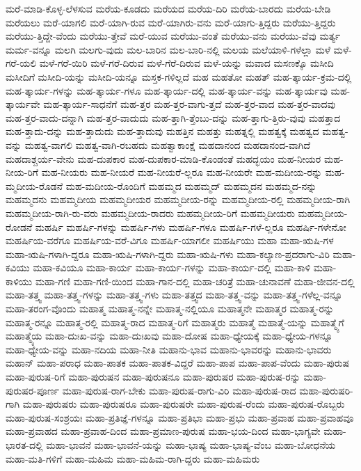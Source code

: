 {ಮರೆ-ಮಾಡಿ-ಕೊಳ್ಳ-ಲೆಳಸುವ
ಮರೆಯ-ಕೂಡದು
ಮರೆಯದ
ಮರೆಯ-ದಿರಿ
ಮರೆಯ-ಬಾರದು
ಮರೆಯ-ಬೇಡಿ
ಮರೆಯಲು
ಮರೆ-ಯಾಗಲಿ
ಮರೆ-ಯಾಗಿ-ರುವ
ಮರೆ-ಯಾಗಿರು-ವನು
ಮರೆ-ಯಾಗು-ತ್ತಿದ್ದರು
ಮರೆಯು-ತ್ತಿದ್ದರು
ಮರೆಯು-ತ್ತಿದ್ದೇ-ವೆಂದು
ಮರೆಯು-ತ್ತೇವೆ
ಮರೆ-ಯುವ
ಮರೆಯು-ವಂತೆ
ಮರೆಯು-ವನು
ಮರೆಯು-ವೆವು
ಮರ್ತ್ಯ
ಮರ್ಮ-ವನ್ನೂ
ಮಲಗಿ
ಮಲಗು-ವುದು
ಮಲ-ಬಾರಿನ
ಮಲ-ಬಾರಿ-ನಲ್ಲಿ
ಮಲಯ
ಮಲೆಯಾಳಿ-ಗಳೆಲ್ಲಾ
ಮಳೆ
ಮಳೆ-ಗರೆ-ಯಲಿ
ಮಳೆ-ಗರೆ-ಯಿರಿ
ಮಳೆ-ಗರೆ-ದಿರುವ
ಮಳೆ-ಗೆರೆ-ದಿರುವ
ಮಳೆ-ಯನ್ನು
ಮವಾದ
ಮಸಣಕ್ಕೊ
ಮಸೀದಿ
ಮಸೀದಿಗೆ
ಮಸೀದಿ-ಯನ್ನು
ಮಸೀದಿ-ಯನ್ನೂ
ಮಸ್ತಕ-ಗಳಿಲ್ಲದೆ
ಮಹ
ಮಹತೋ
ಮಹತ್
ಮಹ-ತ್ಕಾರ್ಯ-ಕ್ರಮ-ದಲ್ಲಿ
ಮಹ-ತ್ಕಾರ್ಯ-ಗಳನ್ನು
ಮಹ-ತ್ಕಾರ್ಯ-ಗಳೂ
ಮಹ-ತ್ಕಾರ್ಯ-ದಲ್ಲಿ
ಮಹ-ತ್ಕಾರ್ಯ-ವನ್ನು
ಮಹ-ತ್ಕಾರ್ಯವು
ಮಹ-ತ್ಕಾರ್ಯವೇ
ಮಹ-ತ್ಕಾರ್ಯ-ಸಾಧನೆಗೆ
ಮಹ-ತ್ತರ
ಮಹ-ತ್ತರ-ವಾಗು-ತ್ತದೆ
ಮಹ-ತ್ತರ-ವಾದ
ಮಹ-ತ್ತರ-ವಾದವು
ಮಹ-ತ್ತರ-ವಾದು-ದನ್ನಾಗಿ
ಮಹ-ತ್ತರ-ವಾದುದು
ಮಹ-ತ್ತಾಗಿ-ತ್ತೆಂಬು-ದನ್ನು
ಮಹ-ತ್ತಾಗು-ತ್ತಿರು-ವುವು
ಮಹತ್ತಾದ
ಮಹ-ತ್ತಾದು-ದನ್ನು
ಮಹ-ತ್ತಾದುದು
ಮಹ-ತ್ತಾದುವು
ಮಹತ್ತಿನ
ಮಹತ್ತು
ಮಹತ್ನಲ್ಲಿ
ಮಹತ್ವಕ್ಕೆ
ಮಹತ್ವದ
ಮಹತ್ವ-ವನ್ನು
ಮಹತ್ವ-ವಾಗಲಿ
ಮಹತ್ವ-ವಾಗಿ-ರಬಹದು
ಮಹತ್ವಾಕಾಂಕ್ಷೆ
ಮಹದಾನಂದ
ಮಹದಾನಂದ-ವಾಗಿದೆ
ಮಹದಾಶ್ಚರ್ಯ-ವೇನು
ಮಹ-ದುಪಕಾರ
ಮಹ-ದುಪಕಾರ-ಮಾಡಿ-ಕೊಂಡಂತೆ
ಮಹದ್ಭಯಂ
ಮಹ-ನೀಯರ
ಮಹ-ನೀಯ-ರಿಗೆ
ಮಹ-ನೀಯರು
ಮಹ-ನೀಯರೆ
ಮಹ-ನೀಯರೆ-ಲ್ಲರೂ
ಮಹ-ನೀಯರೇ
ಮಹ-ಮದೀಯ-ರನ್ನು
ಮಹ-ಮ್ಮದೀಯ-ರೊಡನೆ
ಮಹ-ಮದೀಯ-ರೊಂದಿಗೆ
ಮಹಮ್ಮದ
ಮಹಮ್ಮದ್
ಮಹಮ್ಮದನ
ಮಹಮ್ಮದ-ನನ್ನು
ಮಹಮ್ಮದನು
ಮಹಮ್ಮದೀಯ
ಮಹಮ್ಮದೀಯರ
ಮಹಮ್ಮದೀಯ-ರನ್ನು
ಮಹಮ್ಮದೀಯ-ರಲ್ಲಿ
ಮಹಮ್ಮದೀಯ-ರಾಗಿ
ಮಹಮ್ಮದೀಯ-ರಾಗಿ-ರು-ವರು
ಮಹಮ್ಮದೀಯ-ರಾದರು
ಮಹಮ್ಮದೀಯ-ರಿಗೆ
ಮಹಮ್ಮದೀಯರು
ಮಹಮ್ಮದೀಯ-ರೋಡನೆ
ಮಹರ್ಷಿ
ಮಹರ್ಷಿ-ಗಳನ್ನು
ಮಹರ್ಷಿ-ಗಳು
ಮಹರ್ಷಿ-ಗಳೂ
ಮಹರ್ಷಿ-ಗಳೆ-ಲ್ಲರೂ
ಮಹರ್ಷಿ-ಗಳೇನೋ
ಮಹರ್ಷಿಯ-ವರೆಗೂ
ಮಹರ್ಷಿಯ-ವರೆ-ವಿಗೂ
ಮಹರ್ಷಿ-ಯಾಗಲೀ
ಮಹರ್ಷಿಯು
ಮಹಾ
ಮಹಾ-ಋಷಿ-ಗಳ
ಮಹಾ-ಋಷಿ-ಗಳಾಗಿ-ದ್ದರೂ
ಮಹಾ-ಋಷಿ-ಗಳಾಗಿ-ದ್ದರು
ಮಹಾ-ಋಷಿ-ಗಳು
ಮಹಾ-ಕಲ್ಯಾಣ-ಪ್ರದರಾಗು-ವಿರಿ
ಮಹಾ-ಕವಿಯು
ಮಹಾ-ಕವಿಯೂ
ಮಹಾ-ಕಾರ್ಯ
ಮಹಾ-ಕಾರ್ಯ-ಗಳನ್ನು
ಮಹಾ-ಕಾರ್ಯ-ದಲ್ಲಿ
ಮಹಾ-ಕಾಳಿ
ಮಹಾ-ಕಾಳಿಯು
ಮಹಾ-ಗಣಿ
ಮಹಾ-ಗಣಿ-ಯಿಂದ
ಮಹಾ-ಗಾನ-ದಲ್ಲಿ
ಮಹಾ-ಚರಿತ್ರೆ
ಮಹಾ-ಚುನಾವಣೆ
ಮಹಾ-ಜೀವನ-ದಲ್ಲಿ
ಮಹಾ-ತತ್ತ್ವ
ಮಹಾ-ತತ್ತ್ವ-ಗಳನ್ನು
ಮಹಾ-ತತ್ತ್ವ-ಗಳು
ಮಹಾ-ತತ್ತ್ವದ
ಮಹಾ-ತತ್ತ್ವ-ವನ್ನು
ಮಹಾ-ತತ್ತ್ವ-ಗಳೆಲ್ಲ-ವನ್ನೂ
ಮಹಾ-ತರಂಗ-ವೊಂದು
ಮಹಾತ್ಮ
ಮಹಾತ್ಮ-ನನ್ನೇ
ಮಹಾತ್ಮ-ನಲ್ಲಿಯೂ
ಮಹಾತ್ಮನೇ
ಮಹಾತ್ಮರ
ಮಹಾತ್ಮ-ರನ್ನು
ಮಹಾತ್ಮ-ರನ್ನೂ
ಮಹಾತ್ಮ-ರಲ್ಲಿ
ಮಹಾತ್ಮ-ರಾದ
ಮಹಾತ್ಮ-ರಿಗೆ
ಮಹಾತ್ಮರು
ಮಹಾತ್ಮೆ
ಮಹಾತ್ಮೆ-ಯನ್ನು
ಮಹಾತ್ಮ್ಯೆಗೆ
ಮಹಾತ್ಮ್ಯೆಯ
ಮಹಾ-ದುಃಖ-ವನ್ನು
ಮಹಾ-ದುಃಖವು
ಮಹಾ-ದೋಷ
ಮಹಾ-ಧ್ಯೇಯಕ್ಕೆ
ಮಹಾ-ಧ್ಯೇಯ-ಗಳನ್ನೂ
ಮಹಾ-ಧ್ಯೇಯ-ವನ್ನು
ಮಹಾ-ನದಿಯ
ಮಹಾ-ನೀತಿ
ಮಹಾನು-ಭಾವ
ಮಹಾನು-ಭಾವರನ್ನು
ಮಹಾನು-ಭಾವರು
ಮಹಾನ್
ಮಹಾ-ಪರಾಧ
ಮಹಾ-ಪಾತಕ
ಮಹಾ-ಪಾತಕ-ವಿದ್ದರೆ
ಮಹಾ-ಪಾಪ
ಮಹಾ-ಪಾಪ-ವೆಂದು
ಮಹಾ-ಪುರುಷ
ಮಹಾ-ಪುರುಷ-ರಿಗೆ
ಮಹಾ-ಪುರುಷನ
ಮಹಾ-ಪುರುಷನೂ
ಮಹಾ-ಪುರುಷರ
ಮಹಾ-ಪುರುಷ-ರನ್ನು
ಮಹಾ-ಪುರುಷರ-ಪೂರ್ಣ
ಮಹಾ-ಪುರುಷ-ರಾಗ-ಬೇಕು
ಮಹಾ-ಪುರುಷ-ರಾಗು-ವಿರಿ
ಮಹಾ-ಪುರುಷ-ರಾದ
ಮಹಾ-ಪುರುಷರಿ-ಗಾಗಿ
ಮಹಾ-ಪುರುಷರು
ಮಹಾ-ಪುರುಷರೂ
ಮಹಾ-ಪುರುಷರೇ
ಮಹಾ-ಪುರುಷ-ರೆಂದು
ಮಹಾ-ಪುರುಷ-ರೊಬ್ಬರು
ಮಹಾ-ಪುರುಷ-ಸಂಶ್ರಯಃ
ಮಹಾ-ಪ್ರತಿಜ್ಞೆ-ಗಳನ್ನೂ
ಮಹಾ-ಪ್ರತಿಭಾ
ಮಹಾ-ಪ್ರಭು
ಮಹಾ-ಪ್ರವಾಹ
ಮಹಾ-ಪ್ರವಾಹವೂ
ಮಹಾ-ಪ್ರವಾಹದ
ಮಹಾ-ಪ್ರವಾಹ-ದಿಂದ
ಮಹಾ-ಪ್ರಮಾಣ-ಪುರುಷ
ಮಹಾ-ಭಯ-ದಿಂದ
ಮಹಾ-ಭಾಗ್ಯವೇ
ಮಹಾ-ಭಾರತ-ದಲ್ಲಿ
ಮಹಾ-ಭಾವನೆ
ಮಹಾ-ಭಾವನೆ-ಯನ್ನು
ಮಹಾ-ಭಾಷ್ಯ
ಮಹಾ-ಭಾಷ್ಯ-ವೆಂಬ
ಮಹಾ-ಬೋಧನೆಯ
ಮಹಾ-ಮತಿ-ಗಳಿಗೆ
ಮಹಾ-ಮಹಿಮ
ಮಹಾ-ಮಹಿಮ-ರಾಗಿ-ದ್ದರು
ಮಹಾ-ಮಹಿಮರು
}
